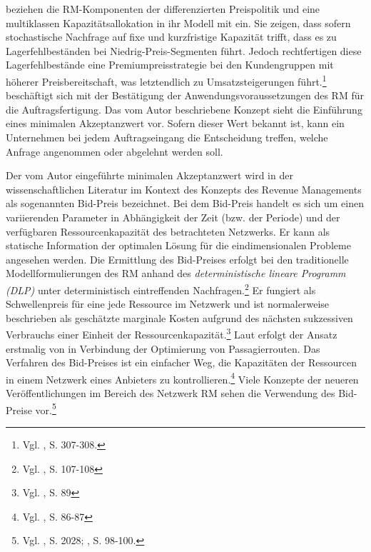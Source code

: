 \cite{deBHarris1995299} beziehen die RM-Komponenten der differenzierten Preispolitik und eine multiklassen Kapazitätsallokation in ihr Modell mit ein. Sie zeigen, dass sofern stochastische Nachfrage auf fixe und kurzfristige Kapazität trifft, dass es zu Lagerfehlbeständen bei Niedrig-Preis-Segmenten führt. Jedoch rechtfertigen diese Lagerfehlbestände eine Premiumpreisstrategie bei den Kundengruppen mit höherer Preisbereitschaft, was letztendlich zu Umsatzsteigerungen führt.\footnote{Vgl. \cite{deBHarris1995299}, S. 307-308.} \cite{Kalyan:2002aa} beschäftigt sich mit der Bestätigung der Anwendungsvoraussetzungen des RM für die Auftragsfertigung. Das vom Autor beschriebene Konzept sieht die Einführung eines minimalen Akzeptanzwert vor. Sofern dieser Wert bekannt ist, kann ein Unternehmen bei jedem Auftragseingang die Entscheidung treffen, welche Anfrage angenommen oder abgelehnt werden soll.

Der vom Autor \cite{Kalyan:2002aa} eingeführte minimalen Akzeptanzwert wird in der wissenschaftlichen Literatur im Kontext des Konzepts des Revenue Managements als sogenannten Bid-Preis bezeichnet. Bei dem Bid-Preis handelt es sich um einen variierenden Parameter in Abhängigkeit der Zeit (bzw. der Periode) und der verfügbaren Ressourcenkapazität des betrachteten Netzwerks. Er kann als statische Information der optimalen Lösung für die eindimensionalen Probleme angesehen werden. Die Ermittlung des Bid-Preises erfolgt bei den traditionelle Modellformulierungen des RM anhand des \textit{deterministische lineare Programm (DLP)} unter deterministisch eintreffenden Nachfragen.\footnote{Vgl. \cite{talluri2004revenue}, S. 107-108} %
Er fungiert als Schwellenpreis für eine jede Ressource im Netzwerk und ist normalerweise beschrieben als geschätzte marginale Kosten aufgrund des nächsten sukzessiven Verbrauchs einer Einheit der Ressourcenkapazität.\footnote{Vgl. \cite{talluri2004theory}, S. 89} Laut \cite{gonsch2013using} erfolgt der Ansatz erstmalig von \cite{talluri2001airline} in Verbindung der Optimierung von Passagierrouten. Das Verfahren des Bid-Preises ist ein einfacher Weg, die Kapazitäten der Ressourcen in einem Netzwerk eines Anbieters zu kontrollieren.\footnote{Vgl. \cite{talluri2004theory}, S. 86-87\label{RMH}} Viele Konzepte der neueren Veröffentlichungen im Bereich des Netzwerk RM sehen die Verwendung des Bid-Preise vor.\footnote{Vgl. \cite{petrick2010dynamic}, S. 2028; \cite{gonsch2013using}, S. 98-100.}

